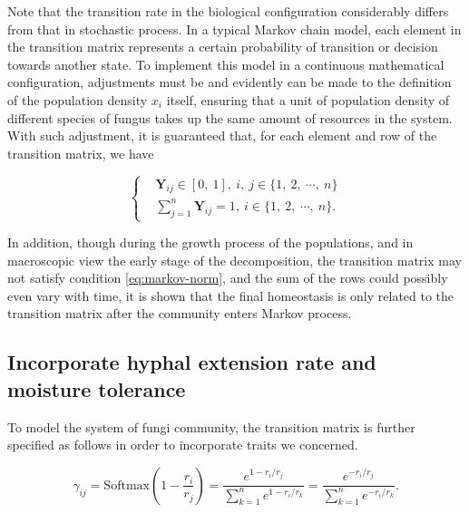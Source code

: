 Note that the transition rate in the biological configuration considerably differs from that in stochastic process. In a typical Markov chain model, each element in the transition matrix represents a certain probability of transition or decision towards another state. To implement this model in a continuous mathematical configuration, adjustments must be and evidently can be made to the definition of the population density $x_i$ itself, ensuring that a unit of population density of different species of fungus takes up the same amount of resources in the system. With such adjustment, it is guaranteed that, for each element and row of the transition matrix, we have

\begin{equation}\label{eq:markov-norm}
    \left\{\begin{aligned} &
        \boldsymbol{Y}_{ij} \in [0,\ 1],\ i,\ j\in\{1,\ 2,\ \cdots,\ n\} \\ &
        \sum_{j=1}^n \boldsymbol{Y}_{ij} = 1,\ i\in\{1,\ 2,\ \cdots,\ n\}.
    \end{aligned}\right.
\end{equation}

In addition, though during the growth process of the populations, and in macroscopic view the early stage of the decomposition, the transition matrix may not satisfy condition \eqref{eq:markov-norm}, and the sum of the rows could possibly even vary with time, it is shown that the final homeostasis is only related to the transition matrix after the community enters Markov process.


\subsection{Incorporate hyphal extension rate and moisture tolerance}

To model the system of fungi community, the transition matrix is further specified as follows in order to incorporate traits we concerned.

\begin{equation}\label{eq:gamma}
    \gamma_{ij} =
    \mathrm{Softmax}\left(1 - \frac{r_i}{r_j}\right) =
    \frac{e^{1 - r_i / r_j}}{\sum_{k=1}^n e^{1 - r_i / r_k}} =
    \frac{e^{- r_i / r_j}}{\sum_{k=1}^n e^{- r_i / r_k}}.
\end{equation}


